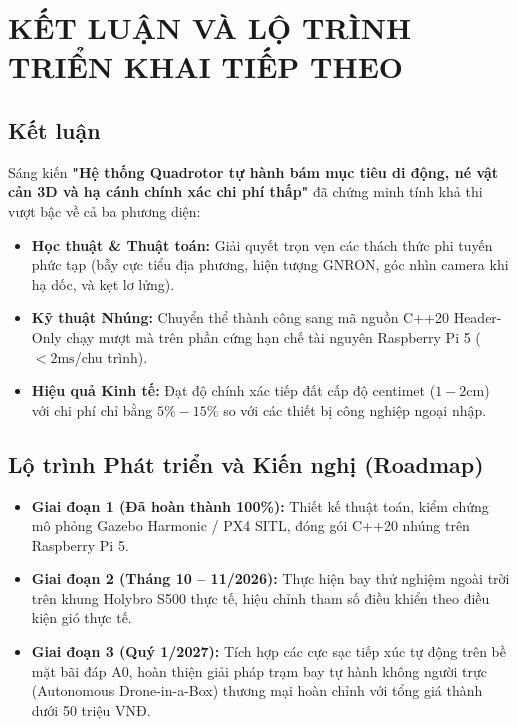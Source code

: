 \documentclass[12pt,a4paper]{article}
\begin{document}
\section{KẾT LUẬN VÀ LỘ TRÌNH TRIỂN KHAI TIẾP THEO}

\subsection{Kết luận}
Sáng kiến \textbf{"Hệ thống Quadrotor tự hành bám mục tiêu di động, né vật cản 3D và hạ cánh chính xác chi phí thấp"} đã chứng minh tính khả thi vượt bậc về cả ba phương diện:
\begin{itemize}[noitemsep,topsep=2pt]
    \item \textbf{Học thuật \& Thuật toán:} Giải quyết trọn vẹn các thách thức phi tuyến phức tạp (bẫy cực tiểu địa phương, hiện tượng GNRON, góc nhìn camera khi hạ dốc, và kẹt lơ lửng).
    \item \textbf{Kỹ thuật Nhúng:} Chuyển thể thành công sang mã nguồn C++20 Header-Only chạy mượt mà trên phần cứng hạn chế tài nguyên Raspberry Pi 5 ($< 2\text{ms}$/chu trình).
    \item \textbf{Hiệu quả Kinh tế:} Đạt độ chính xác tiếp đất cấp độ centimet ($1 - 2\text{cm}$) với chi phí chỉ bằng $5\% - 15\%$ so với các thiết bị công nghiệp ngoại nhập.
\end{itemize}

\subsection{Lộ trình Phát triển và Kiến nghị (Roadmap)}
\begin{itemize}[noitemsep,topsep=2pt]
    \item \textbf{Giai đoạn 1 (Đã hoàn thành 100\%):} Thiết kế thuật toán, kiểm chứng mô phỏng Gazebo Harmonic / PX4 SITL, đóng gói C++20 nhúng trên Raspberry Pi 5.
    \item \textbf{Giai đoạn 2 (Tháng 10 -- 11/2026):} Thực hiện bay thử nghiệm ngoài trời trên khung Holybro S500 thực tế, hiệu chỉnh tham số điều khiển theo điều kiện gió thực tế.
    \item \textbf{Giai đoạn 3 (Quý 1/2027):} Tích hợp các cực sạc tiếp xúc tự động trên bề mặt bãi đáp A0, hoàn thiện giải pháp trạm bay tự hành không người trực (Autonomous Drone-in-a-Box) thương mại hoàn chỉnh với tổng giá thành dưới 50 triệu VNĐ.
\end{itemize}
\end{document}
